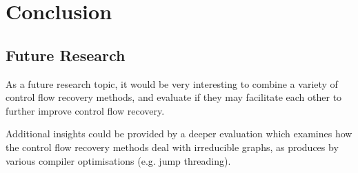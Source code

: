 
\section{Conclusion}


\subsection{Future Research}

As a future research topic, it would be very interesting to combine a variety of control flow recovery methods, and evaluate if they may facilitate each other to further improve control flow recovery.

Additional insights could be provided by a deeper evaluation which examines how the control flow recovery methods deal with irreducible graphs, as produces by various compiler optimisations (e.g. jump threading).
